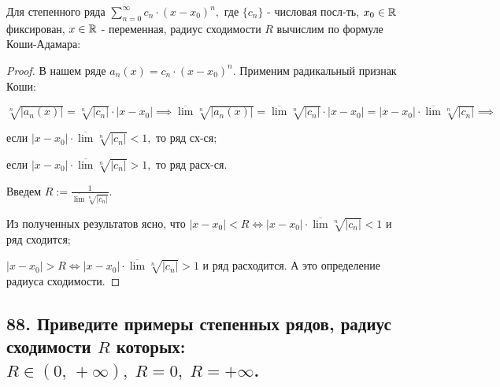 \documentclass[a4paper, fleqn]{article}
\begin{document}
    Для степенного ряда $\displaystyle \sum_{n = 0}^{\infty} c_n \cdot (x - x_0)^n,$ где $\{ c_n \}$ - числовая посл-ть, $x_0 \in \mathbb{R}$ фиксирован,  $x \in \mathbb{R}$ - переменная, радиус сходимости $R$ вычислим по формуле Коши-Адамара:
    
    
        \begin{proof} 
        В нашем ряде $a_n(x) = c_n \cdot (x - x_0)^n.$ Применим радикальный признак Коши: 
        
        $\sqrt[n]{|a_n(x)|} = \sqrt[n]{|c_n|} \cdot |x - x_0| \implies
        \overline{\lim} \sqrt[n]{|a_n(x)|} = \overline{\lim} \sqrt[n]{|c_n|} \cdot |x - x_0| =
        |x - x_0| \cdot \overline{\lim} \sqrt[n]{|c_n|} \implies $ 
        
        если $|x - x_0| \cdot \overline{\lim} \sqrt[n]{|c_n|} < 1,$ то ряд сх-ся;
        
        если $|x - x_0| \cdot \overline{\lim} \sqrt[n]{|c_n|} > 1,$ то ряд расх-ся.
        
        Введем $R := \frac{1}{\overline{\lim} \sqrt[n]{|c_n|}}.$
        
        Из полученных результатов ясно, что $|x - x_0| < R \iff |x - x_0| \cdot \overline{\lim} \sqrt[n]{|c_n|} < 1$ и ряд сходится; 
        
        $|x - x_0| > R \iff |x - x_0| \cdot \overline{\lim} \sqrt[n]{|c_n|} > 1$ и ряд расходится. А это определение радиуса сходимости.
        
        \end{proof}
        
    \subsection*{88. Приведите примеры степенных рядов, радиус сходимости $R$ которых: $R \in (0, \, +\infty), \; R = 0, \; R = +\infty$.}
\end{document}
